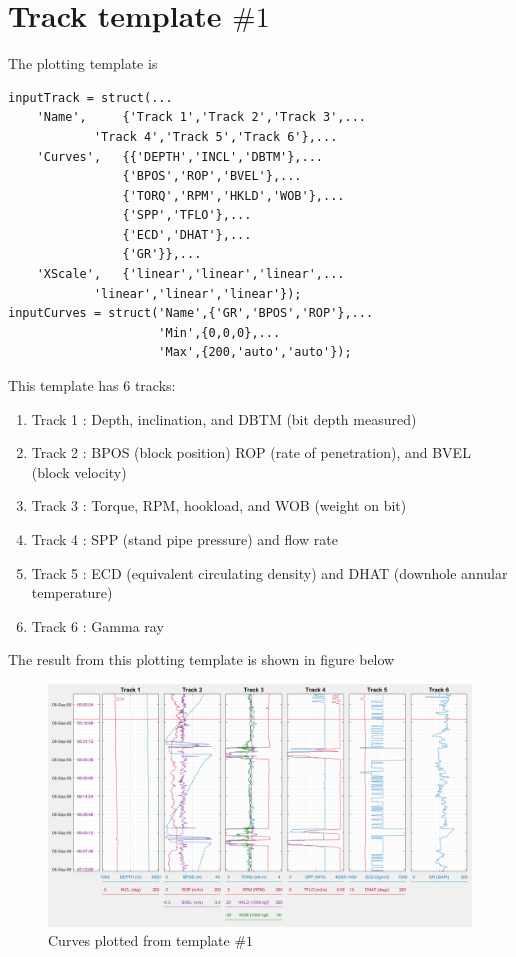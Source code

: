\documentclass[12pt,a4paper,oneside]{report}
\begin{document}
\section{Track template $\#1$}
The plotting template is
\begin{lstlisting}[style=Matlab-editor]
inputTrack = struct(...
    'Name',     {'Track 1','Track 2','Track 3',...
    		'Track 4','Track 5','Track 6'},...
    'Curves',   {{'DEPTH','INCL','DBTM'},...
                {'BPOS','ROP','BVEL'},...
                {'TORQ','RPM','HKLD','WOB'},...
                {'SPP','TFLO'},...
                {'ECD','DHAT'},...
                {'GR'}},...
    'XScale',   {'linear','linear','linear',...
    		'linear','linear','linear'});
inputCurves = struct('Name',{'GR','BPOS','ROP'},...
                     'Min',{0,0,0},...
                     'Max',{200,'auto','auto'});
\end{lstlisting}

\noindent This template has 6 tracks:
\begin{enumerate}
\setlength\itemsep{0.1em}
\item Track 1 : Depth, inclination, and DBTM (bit depth measured)
\item Track 2 : BPOS (block position) ROP (rate of penetration), and BVEL (block velocity)
\item Track 3 : Torque, RPM, hookload, and WOB (weight on bit)
\item Track 4 : SPP (stand pipe pressure) and flow rate
\item Track 5 : ECD (equivalent circulating density) and DHAT (downhole annular temperature)
\item Track 6 : Gamma ray
\end{enumerate}

\noindent The result from this plotting template is shown in figure below
\begin{figure}[H]
\centering
\includegraphics[width=\textwidth]{fig/example1.PNG}
\caption{Curves plotted from template $\#1$}
\end{figure}
\end{document}
